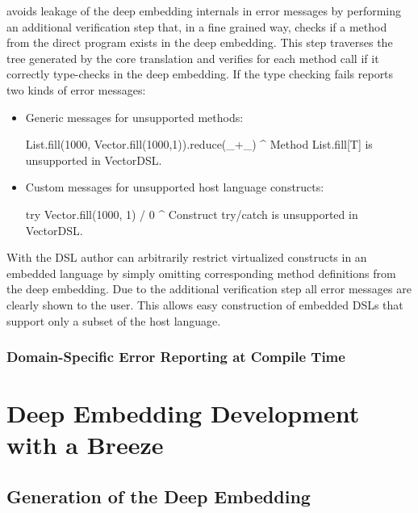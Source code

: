 \yy avoids leakage of the deep embedding internals in error messages by performing an
additional verification step that, in a fine grained way, checks if a method
from the direct program exists in the deep embedding. This step traverses the
tree generated by the core translation and verifies for each method call if it
correctly type-checks in the deep embedding. If the type checking fails \yy
reports two kinds of error messages:

\begin{itemize}
\item Generic messages for unsupported methods:\begin{lstparagraph}
List.fill(1000, Vector.fill(1000,1)).reduce(_+_)
^
Method List.fill[T] is unsupported in VectorDSL.
\end{lstparagraph}

\item Custom messages for unsupported host language constructs:\begin{lstparagraph}
try Vector.fill(1000, 1) / 0
^
Construct try/catch is unsupported in VectorDSL.
\end{lstparagraph}
\end{itemize}
%
With \yy the DSL author can arbitrarily restrict virtualized constructs in an
embedded language by simply omitting corresponding method definitions from the
deep embedding. Due to the additional verification step all error messages are
clearly shown to the user. This allows easy construction of embedded DSLs that
support only a subset of the host language.

\section{Domain-Specific Error Reporting at Compile Time}
\label{sec:domain-specific-error-reporting}


\part{Deep Embedding Development with a Breeze}
\label{part:deep-embedding-development-with-a-breeze}

\chapter{Generation of the Deep Embedding}
\label{sec:deep-gen}

